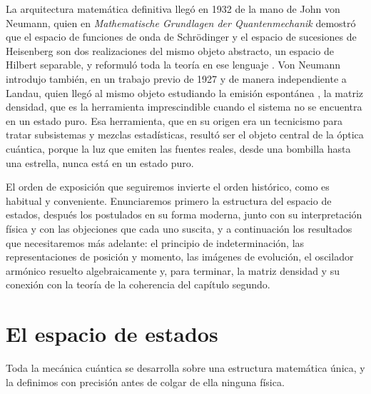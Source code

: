     La arquitectura matemática definitiva llegó en 1932 de la mano de John von Neumann, quien en \textit{Mathematische Grundlagen der Quantenmechanik} demostró que el espacio de funciones de onda de Schrödinger y el espacio de sucesiones de Heisenberg son dos realizaciones del mismo objeto abstracto, un espacio de Hilbert separable, y reformuló toda la teoría en ese lenguaje \citep{vonneumann1932mathematische}. Von Neumann introdujo también, en un trabajo previo de 1927 \citep{vonneumann1927wahrscheinlichkeitstheoretischer} y de manera independiente a Landau, quien llegó al mismo objeto estudiando la emisión espontánea \citep{landau1927dampfungsproblem}, la matriz densidad, que es la herramienta imprescindible cuando el sistema no se encuentra en un estado puro. Esa herramienta, que en su origen era un tecnicismo para tratar subsistemas y mezclas estadísticas, resultó ser el objeto central de la óptica cuántica, porque la luz que emiten las fuentes reales, desde una bombilla hasta una estrella, nunca está en un estado puro.

    El orden de exposición que seguiremos invierte el orden histórico, como es habitual y conveniente. Enunciaremos primero la estructura del espacio de estados, después los postulados en su forma moderna, junto con su interpretación física y con las objeciones que cada uno suscita, y a continuación los resultados que necesitaremos más adelante: el principio de indeterminación, las representaciones de posición y momento, las imágenes de evolución, el oscilador armónico resuelto algebraicamente y, para terminar, la matriz densidad y su conexión con la teoría de la coherencia del capítulo segundo.

\section{El espacio de estados}

        Toda la mecánica cuántica se desarrolla sobre una estructura matemática única, y la definimos con precisión antes de colgar de ella ninguna física.

